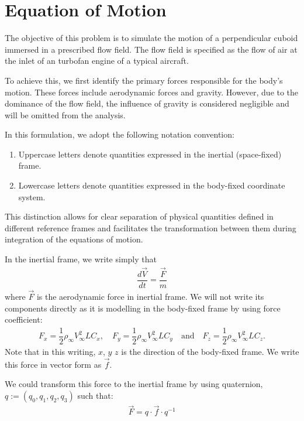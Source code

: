 \documentclass[12pt, a4paper]{article}
\begin{document}
\section{Equation of Motion}

The objective of this problem is to simulate the motion of a perpendicular cuboid immersed in a prescribed flow field. The flow field is specified as the flow of air at the inlet of an turbofan engine of a typical aircraft.


To achieve this, we first identify the primary forces responsible for the body’s motion. These forces include aerodynamic forces and gravity. However, due to the dominance of the flow field, the influence of gravity is considered negligible and will be omitted from the analysis.


In this formulation, we adopt the following notation convention:
\begin{enumerate}
	\item Uppercase letters denote quantities expressed in the inertial (space-fixed) frame.
	\item Lowercase letters denote quantities expressed in the body-fixed coordinate system.
\end{enumerate}

This distinction allows for clear separation of physical quantities defined in different reference frames and facilitates the transformation between them during integration of the equations of motion.

In the inertial frame, we write simply that
\begin{align}
	\dfrac{d\vec{V}}{dt} = \dfrac{\vec{F}}{m}
\end{align}
where $\vec{F}$ is the aerodynamic force in inertial frame. We will not write its components directly as it is modelling in the body-fixed frame by using force coefficient:
\begin{align}
	F_x = \dfrac{1}{2} \rho_\infty V_\infty^2 L C_x, \quad F_y = \dfrac{1}{2} \rho_\infty V_\infty^2 L C_y \quad \text{and} \quad F_z = \dfrac{1}{2} \rho_\infty V_\infty^2 L C_z.
\end{align}
Note that in this writing, $x$, $y$ $z$ is the direction of the body-fixed frame. We write this force in vector form as $\vec{f}$.

We could transform this force to the inertial frame by using quaternion, $q := (q_0, q_1, q_2, q_3)$ such that:
\begin{align}
\vec{F} = q \cdot \vec{f} \cdot q^{-1}
\end{align}
\end{document}
